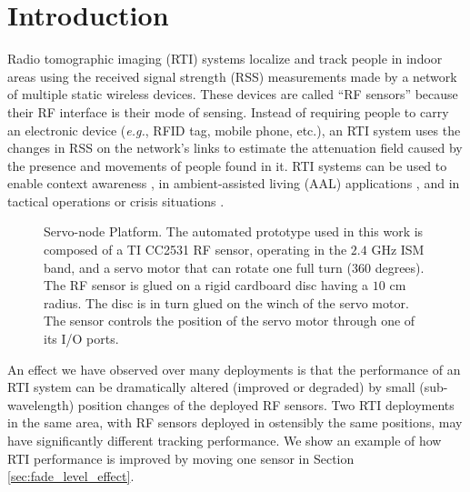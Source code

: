\documentclass[conference]{IEEEtran}
\begin{document}
\IEEEpeerreviewmaketitle









\section{Introduction}
\label{sec:introduction}

Radio tomographic imaging (RTI) systems \cite{Wilson_RTI_2010,Patwari_2010_IEEE} localize and track people in indoor areas using the received signal strength (RSS) measurements made by a network of multiple static wireless devices.  These devices are called ``RF sensors'' because their RF interface is their mode of sensing. Instead of requiring people to carry an electronic device (\emph{e.g.}, RFID tag, mobile phone, etc.), an RTI system uses the changes in RSS on the network's links to estimate the attenuation field caused by the presence and movements of people found in it. RTI systems can be used to enable context awareness \cite{Grandma_2012,Xu_2013,MTT_2013,Nannuru_2013}, in ambient-assisted living (AAL) applications \cite{EvAAL_book,falling_detection}, and in tactical operations or crisis situations \cite{Timonen_RTI,Joint_UWB_RSS}.

\begin{figure}[t]
    \begin{center}
        \caption{Servo-node Platform. The automated prototype used in this work is composed of a TI CC2531 RF sensor, operating in the $2.4$ GHz ISM band, and a servo motor that can rotate one full turn ($360$ degrees). The RF sensor is glued on a rigid cardboard disc having a $10$ cm radius. The disc is in turn glued on the winch of the servo motor. The sensor controls the position of the servo motor through one of its I/O ports.}
        \label{fig:servo_node}
    \end{center}
\end{figure}

An effect we have observed over many deployments is that the performance of an RTI system can be dramatically altered (improved or degraded) by small (sub-wavelength) position changes of the deployed RF sensors.  Two RTI deployments in the same area, with RF sensors deployed in ostensibly the same positions, may have significantly different tracking performance.  We show an example of how RTI performance is improved by moving one sensor in Section \ref{sec:fade_level_effect}.
\end{document}
